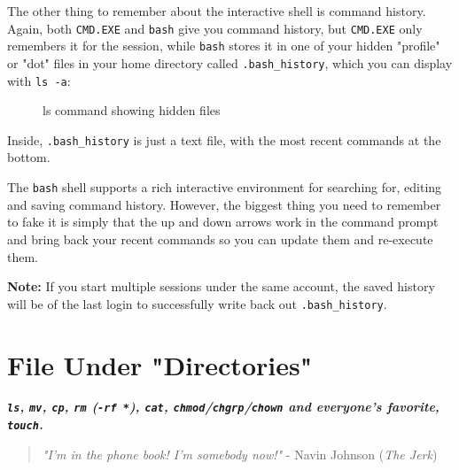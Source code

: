 \documentclass[10pt,american,]{book}
\newenvironment{Shaded}{\begin{snugshade}}{\end{snugshade}}
\newcommand{\KeywordTok}[1]{\textcolor[rgb]{0.13,0.29,0.53}{\textbf{{#1}}}}
\newcommand{\NormalTok}[1]{{#1}}
\numberwithin{figure}{chapter}
\DeclareRobustCommand{\drcap}[1]{\begin{figure}[H]\caption{#1}\end{figure}}
\renewcommand{\KeywordTok}[1]{{#1}}
\renewcommand{\NormalTok}[1]{{#1}}
\begin{document}
The other thing to remember about the interactive shell is command
history. Again, both \texttt{CMD.EXE} and \texttt{bash} give you command
history, but \texttt{CMD.EXE} only remembers it for the session, while
\texttt{bash} stores it in one of your hidden "profile" or "dot" files
in your home directory called \texttt{.bash\_history}, which you can
display with \texttt{ls\ -a}:

\drcap{ls command showing hidden files}

\begin{Shaded}
\end{Shaded}

Inside, \texttt{.bash\_history} is just a text file, with the most
recent commands at the bottom.

The \texttt{bash} shell supports a rich interactive environment for
searching for, editing and saving command history. However, the biggest
thing you need to remember to fake it is simply that the up and down
arrows work in the command prompt and bring back your recent commands so
you can update them and re-execute them.

\textbf{Note:} If you start multiple sessions under the same account,
the saved history will be of the last login to successfully write back
out \texttt{.bash\_history}.

\hypertarget{file-under-directories}{\chapter{File Under
"Directories"}\label{file-under-directories}}

\textbf{\emph{\texttt{ls}, \texttt{mv}, \texttt{cp}, \texttt{rm}
(\texttt{-rf\ *}), \texttt{cat},
\texttt{chmod}/\texttt{chgrp}/\texttt{chown} and everyone's favorite,
\texttt{touch}.}}

\begin{quote}
\emph{"I'm in the phone book! I'm somebody now!"} - Navin Johnson
(\emph{The Jerk})
\end{quote}
\end{document}
